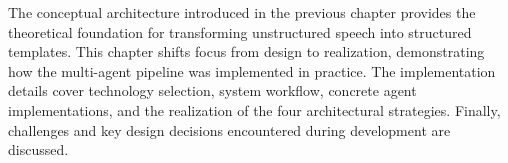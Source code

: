 The conceptual architecture introduced in the previous chapter provides the theoretical foundation for transforming unstructured speech into structured templates. This chapter shifts focus from design to realization, demonstrating how the multi-agent pipeline was implemented in practice. The implementation details cover technology selection, system workflow, concrete agent implementations, and the realization of the four architectural strategies. Finally, challenges and key design decisions encountered during development are discussed.





